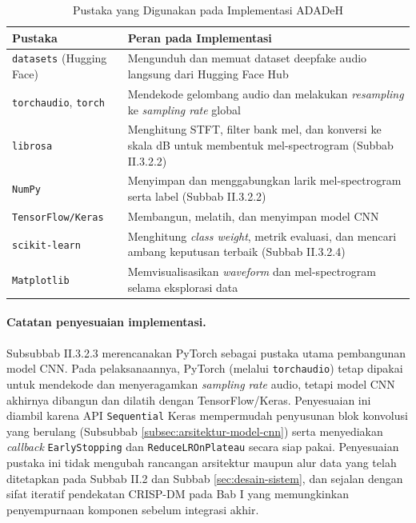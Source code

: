 \begin{table}[htbp]
  \centering
  \caption{Pustaka yang Digunakan pada Implementasi ADADeH}
  \label{tab:pustaka-implementasi}
  \begin{tabular}{@{}lp{9.3cm}@{}}
    \toprule
    \textbf{Pustaka} & \textbf{Peran pada Implementasi} \\
    \midrule
    \texttt{datasets} (Hugging Face) & Mengunduh dan memuat dataset deepfake audio langsung
    dari Hugging Face Hub \\
    \texttt{torchaudio}, \texttt{torch} & Mendekode gelombang audio dan melakukan
    \textit{resampling} ke \textit{sampling rate} global \\
    \texttt{librosa} & Menghitung STFT, filter bank mel, dan konversi ke skala dB untuk
    membentuk mel-spectrogram (Subbab II.3.2.2) \\
    \texttt{NumPy} & Menyimpan dan menggabungkan larik mel-spectrogram serta label
    (Subbab II.3.2.2) \\
    \texttt{TensorFlow/Keras} & Membangun, melatih, dan menyimpan model CNN \\
    \texttt{scikit-learn} & Menghitung \textit{class weight}, metrik evaluasi, dan mencari
    ambang keputusan terbaik (Subbab II.3.2.4) \\
    \texttt{Matplotlib} & Memvisualisasikan \textit{waveform} dan mel-spectrogram selama
    eksplorasi data \\
    \bottomrule
  \end{tabular}
\end{table}

\paragraph{Catatan penyesuaian implementasi.}
Subsubbab II.3.2.3 merencanakan PyTorch sebagai pustaka utama pembangunan model
CNN. Pada pelaksanaannya, PyTorch (melalui \texttt{torchaudio}) tetap dipakai untuk
mendekode dan menyeragamkan \textit{sampling rate} audio, tetapi model CNN
akhirnya dibangun dan dilatih dengan TensorFlow/Keras. Penyesuaian ini diambil
karena API \texttt{Sequential} Keras mempermudah penyusunan blok konvolusi yang
berulang (Subsubbab \ref{subsec:arsitektur-model-cnn}) serta menyediakan
\textit{callback} \texttt{EarlyStopping} dan \texttt{ReduceLROnPlateau} secara
siap pakai. Penyesuaian pustaka ini tidak mengubah rancangan arsitektur maupun
alur data yang telah ditetapkan pada Subbab II.2 dan Subbab \ref{sec:desain-sistem},
dan sejalan dengan sifat iteratif pendekatan CRISP-DM pada Bab I yang
memungkinkan penyempurnaan komponen sebelum integrasi akhir.


